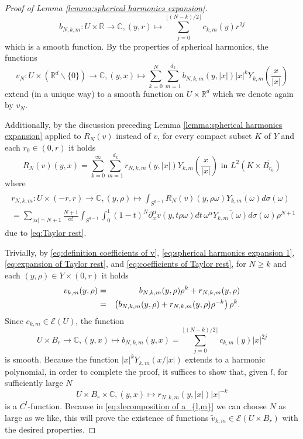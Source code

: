 \documentclass[a4paper,10pt]{amsart}
\newtheorem*{crucial lemma}{Lemma \ref{lem:nice polynomial2}}
\theoremstyle{definition}
\newcommand{\R}{\mathbb{R}}
\newcommand{\C}{\mathbb{C}}
\begin{document}
\begin{proof}[Proof of Lemma \ref{lemma:spherical harmonics expansion}]
	\begin{equation}\label{eq:spherical harmonics expansion 0}
		b_{N,k,m}:U\times\R\rightarrow\C, (y,r)\mapsto \sum_{j=0}^{\lfloor(N-k)/2\rfloor} c_{k,m}(y) r^{2j}
	\end{equation}
	which is a smooth function. By the properties of spherical harmonics, the functions
	\begin{equation}\label{eq:definition of v_N}
		v_N:U\times(\R^d\backslash\{0\})\rightarrow\C,(y,x)\mapsto \sum_{k=0}^N\sum_{m=1}^{d_k} b_{N,k,m}(y,|x|)|x|^k Y_{k,m}\left(\frac{x}{|x|}\right)
	\end{equation}
	extend (in a unique way) to a smooth function on $U\times\R^d$ which we denote again by $v_N$. 
	
	Additionally, by the discussion preceding Lemma \ref{lemma:spherical harmonics expansion} applied to $R_N(v)$ instead of $v$, for every compact subset $K$ of $Y$ and each $r_0\in (0,r)$ it holds
	\begin{equation}\label{eq:expansion of Taylor rest}
		R_N(v)(y,x)=\sum_{k=0}^\infty\sum_{m=1}^{d_k}r_{N,k,m}(y,|x|) Y_{k,m}\left(\frac{x}{|x|}\right)\text{ in }L^2(K\times \overline{B_{r_0}})
	\end{equation}
	where
	\begin{eqnarray}\label{eq:coefficients of Taylor rest}
		\begin{gathered}
		r_{N,k,m}: U\times (-r,r)\rightarrow\C,(y,\rho)\mapsto \int_{S^{d-1}}R_N(v)(y,\rho\omega)\overline{Y_{k,m}(\omega)}d\sigma(\omega)\\
		=\sum_{|\alpha|=N+1}\frac{N+1}{\alpha!} \int_{S^{d-1}} \int_0^1 (1-t)^N \partial_x^\alpha v(y,t\rho\omega)dt\, \omega^\alpha \overline{Y_{k,m}(\omega)} d\sigma(\omega)\rho^{N+1}
		\end{gathered}
	\end{eqnarray}
	due to \eqref{eq:Taylor rest}.
    
	Trivially, by \eqref{eq:definition coefficients of v}, \eqref{eq:spherical harmonics expansion 1}, \eqref{eq:expansion of Taylor rest}, and \eqref{eq:coefficients of Taylor rest}, for $N\geq k$ and each $(y,\rho)\in Y\times(0,r)$ it holds
	\begin{eqnarray}\label{eq:decomposition of a_{l,m}}
		v_{k,m}(y,\rho)&=&b_{N,k,m}(y,\rho)\rho^k+r_{N,k,m}(y,\rho)\nonumber\\
		&=&\left(b_{N,k,m}(y,\rho)+r_{N,k,m}(y,\rho)\rho^{-k}\right)\rho^k.
	\end{eqnarray}
    Since $c_{k,m}\in \mathscr{E}(U)$, the function
	\[U\times B_r\rightarrow\C, (y,x)\mapsto b_{N,k,m}(y,x)=\sum_{j=0}^{\lfloor (N-k)/2\rfloor} c_{k,m}(y)|x|^{2j} \]
	is smooth. Because the function $|x|^k Y_{k,m}(x/|x|)$ extends to a harmonic polynomial, in order to complete the proof, it suffices to show that, given $l$, for sufficiently large $N$
	\[U\times B_r\times\C, (y,x)\mapsto r_{N,k,m}(y,|x|)|x|^{-k}\]
	is a $C^l$-function. Because in \eqref{eq:decomposition of a_{l,m}} we can choose $N$ as large as we like, this will prove the existence of functions $\tilde{v}_{k,m}\in\mathscr{E}(U\times B_r)$ with the desired properties.
	

\end{proof}
\end{document}
